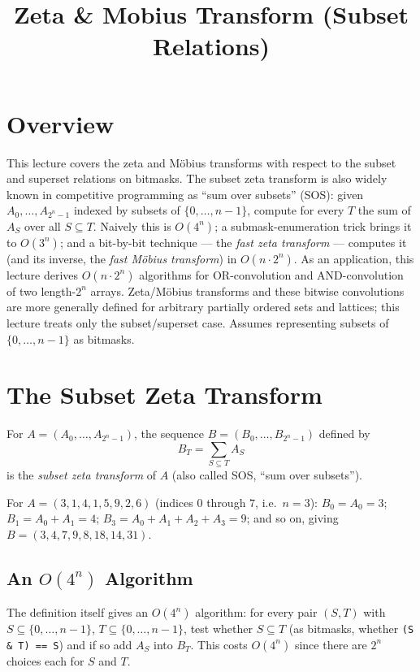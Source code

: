 \documentclass[11pt]{article}
\title{Zeta \& Mobius Transform (Subset Relations)}
\author{}
\date{}
\begin{document}
\thispagestyle{fancy}


\section{Overview}
This lecture covers the zeta and M\"obius transforms with respect to the
subset and superset relations on bitmasks. The subset zeta transform is
also widely known in competitive programming as ``sum over subsets''
(SOS): given $A_0,\ldots,A_{2^n-1}$ indexed by subsets of
$\{0,\ldots,n-1\}$, compute for every $T$ the sum of $A_S$ over all
$S \subseteq T$. Naively this is $O(4^n)$; a submask-enumeration trick
brings it to $O(3^n)$; and a bit-by-bit technique --- the \emph{fast
zeta transform} --- computes it (and its inverse, the \emph{fast M\"obius
transform}) in $O(n\cdot 2^n)$. As an application, this lecture derives
$O(n\cdot 2^n)$ algorithms for OR-convolution and AND-convolution of two
length-$2^n$ arrays. Zeta/M\"obius transforms and these bitwise
convolutions are more generally defined for arbitrary partially ordered
sets and lattices; this lecture treats only the subset/superset case.
Assumes representing subsets of $\{0,\ldots,n-1\}$ as bitmasks.

\section{The Subset Zeta Transform}
\begin{definitionbox}
For $A=(A_0,\ldots,A_{2^n-1})$, the sequence $B=(B_0,\ldots,B_{2^n-1})$
defined by
\[
  B_T = \sum_{S \subseteq T} A_S
\]
is the \emph{subset zeta transform} of $A$ (also called SOS, ``sum over
subsets'').
\end{definitionbox}

\begin{examplebox}
For $A=(3,1,4,1,5,9,2,6)$ (indices $0$ through $7$, i.e.\ $n=3$):
$B_0=A_0=3$; $B_1=A_0+A_1=4$; $B_3=A_0+A_1+A_2+A_3=9$; and so on, giving
$B=(3,4,7,9,8,18,14,31)$.
\end{examplebox}

\subsection{An \texorpdfstring{$O(4^n)$}{O(4\^{}n)} Algorithm}
The definition itself gives an $O(4^n)$ algorithm: for every pair
$(S,T)$ with $S \subseteq \{0,\ldots,n-1\}$, $T \subseteq
\{0,\ldots,n-1\}$, test whether $S \subseteq T$ (as bitmasks, whether
\texttt{(S \& T) == S}) and if so add $A_S$ into $B_T$. This costs
$O(4^n)$ since there are $2^n$ choices each for $S$ and $T$.
\end{document}
